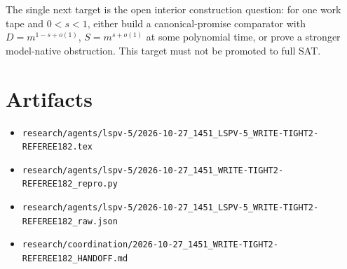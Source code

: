 \documentclass[11pt]{article}
\begin{document}
The single next target is the open interior construction question: for one
work tape and $0<s<1$, either build a canonical-promise comparator with
$D=m^{1-s+o(1)}$, $S=m^{s+o(1)}$ at some polynomial time, or prove a stronger
model-native obstruction.  This target must not be promoted to full SAT.

\section*{Artifacts}
\begin{itemize}
\item \texttt{research/agents/lspv-5/2026-10-27\_1451\_LSPV-5\_WRITE-TIGHT2-REFEREE182.tex}
\item \texttt{research/agents/lspv-5/2026-10-27\_1451\_WRITE-TIGHT2-REFEREE182\_repro.py}
\item \texttt{research/agents/lspv-5/2026-10-27\_1451\_LSPV-5\_WRITE-TIGHT2-REFEREE182\_raw.json}
\item \texttt{research/coordination/2026-10-27\_1451\_WRITE-TIGHT2-REFEREE182\_HANDOFF.md}
\end{itemize}

\end{document}
